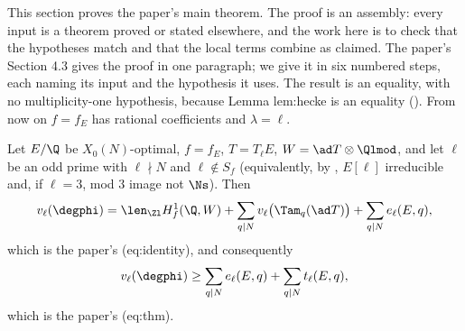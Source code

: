 This section proves the paper's main theorem. The proof is an assembly: every input is a theorem proved or stated elsewhere, and the work here is to check that the
hypotheses match and that the local terms combine as claimed. The paper's Section 4.3 gives the proof in one paragraph; we give it in six numbered steps, each naming its
input and the hypothesis it uses. The result is an equality, with no multiplicity-one hypothesis, because Lemma lem:hecke is an equality ().
From now on $f=f_E$ has rational coefficients and $\lambda=\ell$.

\begin{theorem}\label{thm:congruence:main}
Let $E/\Q$ be $X_0(N)$-optimal, $f=f_E$, $T=T_\ell E$, $W=\ad T\otimes\Qlmod$, and let $\ell$ be an odd prime with $\ell\nmid N$ and $\ell\notin S_f$ (equivalently, by , $E[\ell]$
irreducible and, if $\ell=3$, mod $3$ image not $\Ns$). Then
\begin{equation}\label{eq:congruence:identity}
v_\ell(\degphi)=\len_{\Zl}H^1_f(\Q,W)+\sum_{q\mid N}v_\ell\bigl(\Tam_q(\ad T)\bigr)+\sum_{q\mid N}e_\ell(E,q),
\end{equation}
which is the paper's (eq:identity), and consequently
\begin{equation}\label{eq:congruence:thm}
v_\ell(\degphi)\ge\sum_{q\mid N}e_\ell(E,q)+\sum_{q\mid N}t_\ell(E,q),
\end{equation}
which is the paper's (eq:thm).
\end{theorem}

